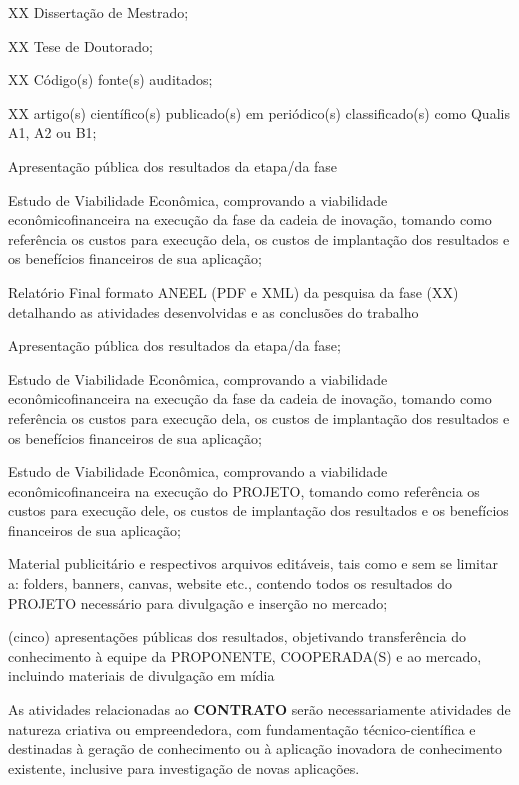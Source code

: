 \xxxx XX Dissertação de Mestrado;

\xxxx XX Tese de Doutorado;

\xxxx XX Código(s) fonte(s) auditados;

\xxxx XX artigo(s) científico(s) publicado(s) em periódico(s) classificado(s) como Qualis A1, A2 ou B1;

\xxxx Apresentação pública dos resultados da etapa/da fase

\xxxx Estudo de Viabilidade Econômica, comprovando a viabilidade econômicofinanceira na execução da fase da cadeia de inovação, tomando como referência os custos para execução dela, os custos de implantação dos resultados e os benefícios financeiros de sua aplicação;

\xxxx Relatório Final formato ANEEL (PDF e XML) da pesquisa da fase (XX) detalhando as atividades desenvolvidas e as conclusões do trabalho

\xxx \textbf{}

\xxxx Apresentação pública dos resultados da etapa/da fase;

\xxxx Estudo de Viabilidade Econômica, comprovando a viabilidade econômicofinanceira na execução da fase da cadeia de inovação, tomando como referência os custos para execução dela, os custos de implantação dos resultados e os benefícios financeiros de sua aplicação;

\xxxx Estudo de Viabilidade Econômica, comprovando a viabilidade econômicofinanceira na execução do PROJETO, tomando como referência os custos para execução dele, os custos de implantação dos resultados e os benefícios financeiros de sua aplicação;

\xxxx Material publicitário e respectivos arquivos editáveis, tais como e sem se limitar a: folders, banners, canvas, website etc., contendo todos os resultados do PROJETO necessário para divulgação e inserção no mercado;

 (cinco) apresentações públicas dos resultados, objetivando transferência do conhecimento à equipe da PROPONENTE, COOPERADA(S) e ao mercado, incluindo materiais de divulgação em mídia


\xx As atividades relacionadas ao \textbf{CONTRATO} serão necessariamente atividades de natureza criativa ou empreendedora, com fundamentação técnico-científica e destinadas à geração de conhecimento ou à aplicação inovadora de conhecimento existente, inclusive para investigação de novas aplicações.


